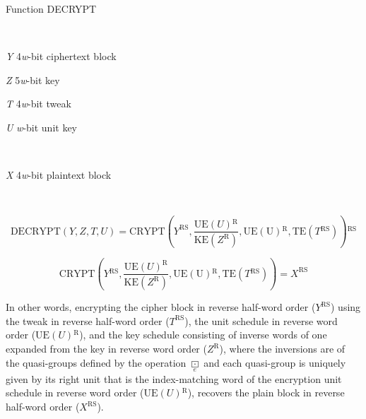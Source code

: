 \documentclass[a4paper,oneside,english]{amsart}
\numberwithin{equation}{section}
\numberwithin{figure}{section}
\newenvironment{lyxlist}[1]
{\begin{list}{}
{\settowidth{\labelwidth}{#1}
 \setlength{\leftmargin}{\labelwidth}
 \addtolength{\leftmargin}{\labelsep}
 \renewcommand{\makelabel}[1]{##1\hfil}}}
{\end{list}}
\begin{document}
\begin{algorithm}
\caption{\label{alg:Function-DECRYPT}Function DECRYPT}

\begin{description}
\item [{Input}]~

\begin{lyxlist}{00.00.0000}
\item [{\emph{Y}}] 4\emph{w}-bit ciphertext block
\item [{\emph{Z}}] 5\emph{w}-bit key
\item [{\emph{T}}] 4\emph{w}-bit tweak
\item [{\emph{U}}] \emph{w}-bit unit key
\end{lyxlist}
\item [{Output}]~

\begin{lyxlist}{00.00.0000}
\item [{\emph{X}}] 4\emph{w}-bit plaintext block
\end{lyxlist}
\item [{Relation}]~


\[
\mathrm{DECRYPT}(Y,Z,T,U)=\mathrm{CRYPT}(Y^{\mathrm{RS}},\frac{\mathrm{UE}(U)\mathrm{^{R}}}{\mathrm{KE}(Z^{\mathrm{R}})}\mathrm{,\mathrm{UE}(U)\mathrm{^{R}},TE}(T\mathrm{^{RS}}))\mathrm{^{RS}}
\]
\end{description}
\end{algorithm}


\[
\mathrm{CRYPT}(Y\mathrm{^{RS}},\mathrm{\frac{UE(\mathit{U})^{R}}{KE(\mathit{Z}^{R})}},\mathrm{\mathrm{UE}(U)\mathrm{^{R}},TE}(T\mathrm{^{RS}}))=X^{\mathrm{RS}}
\]


In other words, encrypting the cipher block in reverse half-word order
($Y^{\mathrm{RS}}$) using the tweak in reverse half-word order ($T^{\mathrm{RS}}$),
the unit schedule in reverse word order ($\mathrm{UE}(U)\mathrm{^{R}}$),
and the key schedule consisting of inverse words of one expanded from
the key in reverse word order ($Z^{\mathrm{R}}$), where the inversions
are of the quasi-groups defined by the operation $\underset{e}{\boxdot}$
and each quasi-group is uniquely given by its right unit that is the
index-matching word of the encryption unit schedule in reverse word
order ($\mathrm{UE}(U)\mathrm{^{R}}$), recovers the plain block in
reverse half-word order ($X^{\mathrm{RS}}$).
\end{document}
